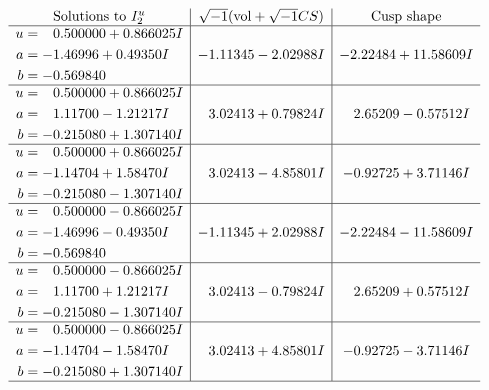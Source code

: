 \documentclass[1p]{elsarticle_modified}
\theoremstyle{definition}
\newcommand{\I}{\sqrt{-1}}
\begin{document}
$$\begin{array}{c|c|c}  
\text{Solutions to }I^u_{2}& \I (\text{vol} + \sqrt{-1}CS) & \text{Cusp shape}\\
 \hline 
\begin{aligned}
u &= \phantom{-}0.500000 + 0.866025 I \\
a &= -1.46996 + 0.49350 I \\
b &= -0.569840\phantom{ +0.000000I}\end{aligned}
 & -1.11345 - 2.02988 I & -2.22484 + 11.58609 I \\ \hline\begin{aligned}
u &= \phantom{-}0.500000 + 0.866025 I \\
a &= \phantom{-}1.11700 - 1.21217 I \\
b &= -0.215080 + 1.307140 I\end{aligned}
 & \phantom{-}3.02413 + 0.79824 I & \phantom{-}2.65209 - 0.57512 I \\ \hline\begin{aligned}
u &= \phantom{-}0.500000 + 0.866025 I \\
a &= -1.14704 + 1.58470 I \\
b &= -0.215080 - 1.307140 I\end{aligned}
 & \phantom{-}3.02413 - 4.85801 I & -0.92725 + 3.71146 I \\ \hline\begin{aligned}
u &= \phantom{-}0.500000 - 0.866025 I \\
a &= -1.46996 - 0.49350 I \\
b &= -0.569840\phantom{ +0.000000I}\end{aligned}
 & -1.11345 + 2.02988 I & -2.22484 - 11.58609 I \\ \hline\begin{aligned}
u &= \phantom{-}0.500000 - 0.866025 I \\
a &= \phantom{-}1.11700 + 1.21217 I \\
b &= -0.215080 - 1.307140 I\end{aligned}
 & \phantom{-}3.02413 - 0.79824 I & \phantom{-}2.65209 + 0.57512 I \\ \hline\begin{aligned}
u &= \phantom{-}0.500000 - 0.866025 I \\
a &= -1.14704 - 1.58470 I \\
b &= -0.215080 + 1.307140 I\end{aligned}
 & \phantom{-}3.02413 + 4.85801 I & -0.92725 - 3.71146 I\\
 \hline 
 \end{array}$$\newpage\newpage\renewcommand{\arraystretch}{1}
\end{document}
